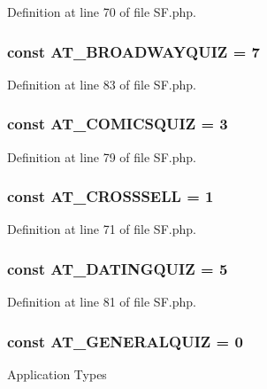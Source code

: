 Definition at line 70 of file SF.php.

\hypertarget{classSF_a26f32cb62871967ffda9f601ef93fc02}{
\subsubsection[{AT\_\-BROADWAYQUIZ}]{\setlength{\rightskip}{0pt plus 5cm}const {\bf AT\_\-BROADWAYQUIZ} = 7}}
\label{classSF_a26f32cb62871967ffda9f601ef93fc02}


Definition at line 83 of file SF.php.

\hypertarget{classSF_a1765a5b8d431cafad76fc38525960b49}{
\subsubsection[{AT\_\-COMICSQUIZ}]{\setlength{\rightskip}{0pt plus 5cm}const {\bf AT\_\-COMICSQUIZ} = 3}}
\label{classSF_a1765a5b8d431cafad76fc38525960b49}


Definition at line 79 of file SF.php.

\hypertarget{classSF_a6fa0275efa28ffffec97c89d046127cc}{
\subsubsection[{AT\_\-CROSSSELL}]{\setlength{\rightskip}{0pt plus 5cm}const {\bf AT\_\-CROSSSELL} = 1}}
\label{classSF_a6fa0275efa28ffffec97c89d046127cc}


Definition at line 71 of file SF.php.

\hypertarget{classSF_a2d2ba543161829c927e7ce5a04f4a14c}{
\subsubsection[{AT\_\-DATINGQUIZ}]{\setlength{\rightskip}{0pt plus 5cm}const {\bf AT\_\-DATINGQUIZ} = 5}}
\label{classSF_a2d2ba543161829c927e7ce5a04f4a14c}


Definition at line 81 of file SF.php.

\hypertarget{classSF_a7345bdf5428de889be26bd1a1b4592bc}{
\subsubsection[{AT\_\-GENERALQUIZ}]{\setlength{\rightskip}{0pt plus 5cm}const {\bf AT\_\-GENERALQUIZ} = 0}}
\label{classSF_a7345bdf5428de889be26bd1a1b4592bc}
Application Types 

